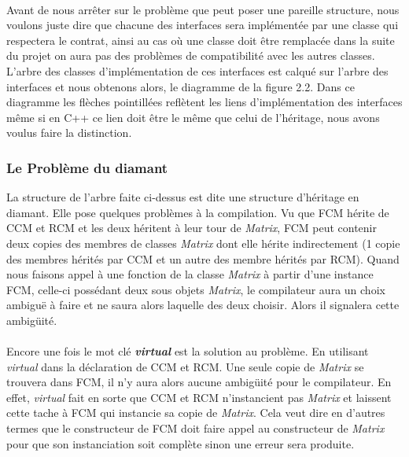 \documentclass[a4paper,10pt]{report}
\begin{document}
\paragraph*{}
Avant de nous arrêter sur le problème que peut poser une pareille structure, nous voulons juste dire que chacune 
des interfaces sera implémentée par une classe qui respectera le contrat, ainsi au cas où une classe doit être remplacée 
dans la suite du projet on aura pas des problèmes de compatibilité avec les autres classes.
L’arbre des classes d’implémentation de ces interfaces est calqué sur l’arbre des interfaces et nous obtenons alors, 
le diagramme de la figure 2.2.\newline
Dans ce diagramme les flèches pointillées reflètent les liens d’implémentation des interfaces même si en C++ ce lien 
doit être le même que celui de l’héritage, nous avons voulus faire la distinction.

\subsubsection{Le Problème du diamant}
La structure de l’arbre faite ci-dessus est dite une structure d’héritage en diamant. Elle pose quelques problèmes à la 
compilation.\newline
Vu que FCM hérite de CCM et RCM et les deux héritent à leur tour de \textit{Matrix}, FCM peut contenir deux copies des membres 
de classes \textit{Matrix} dont elle hérite indirectement (1 copie des membres hérités par CCM et un autre des membre 
hérités par RCM). Quand nous faisons appel à une fonction de la classe \textit{Matrix} à partir d’une instance FCM, 
celle-ci possédant deux sous objets \textit{Matrix}, le compilateur aura un choix ambiguë à faire et ne saura alors 
laquelle des deux choisir. Alors il signalera cette ambigüité.
\paragraph*{}
Encore une fois le mot clé \textbf{\textit{virtual}} est la solution au problème.  En utilisant \textit{virtual} dans la  
déclaration de CCM et RCM. Une seule copie de \textit{Matrix} se trouvera dans FCM, il n'y aura alors aucune ambigüité pour 
le compilateur.\newline
En effet, \textit{virtual} fait en sorte que CCM et RCM n’instancient pas \textit{Matrix} et laissent cette tache à FCM 
qui instancie sa copie de \textit{Matrix}. Cela veut dire en d’autres termes que le constructeur de FCM doit faire appel 
au constructeur de \textit{Matrix} pour que son instanciation soit complète sinon une erreur sera produite.
\end{document}
